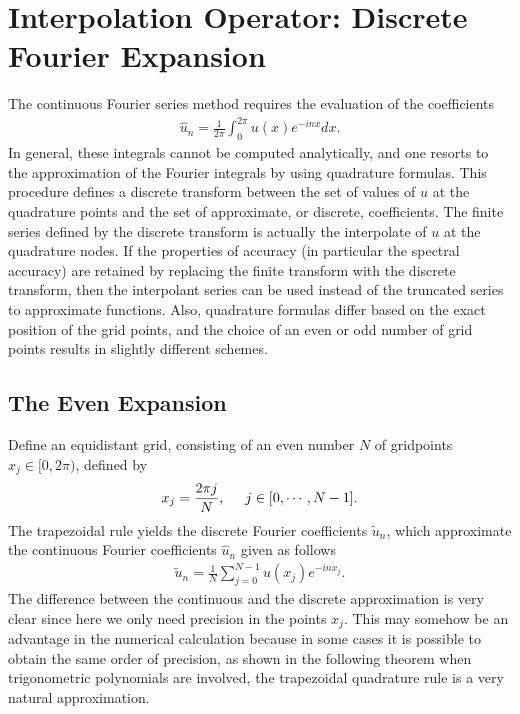\section{Interpolation Operator: Discrete Fourier Expansion}
    
    The continuous Fourier series method requires the evaluation of the coefficients
    \begin{align}
        \hat{u}_n = \displaystyle \frac{1}{2\pi} \int_{0}^{2\pi} u(x) e^{-inx} dx.
    \end{align}
    In general, these integrals cannot be computed analytically, and one resorts to the approximation of the Fourier integrals by using quadrature formulas. This procedure defines a discrete transform between the set of values of $u$ at the quadrature points and the set of approximate, or discrete, coefficients. The finite series defined by the discrete transform is actually the interpolate of $u$ at the quadrature nodes. If the properties of accuracy (in particular the spectral accuracy) are retained by replacing the finite transform with the discrete transform, then the interpolant series can be used instead of the truncated series to approximate functions. Also, quadrature formulas differ based on the exact position of the grid points, and the choice of an even or odd number of grid points results in slightly different schemes.
    
    \subsection{The Even Expansion}
    
    Define an equidistant grid, consisting of an even number $N$ of gridpoints $x_j \in [0, 2\pi)$, defined by
	\begin{align*}
        x_j = \frac{2 \pi j}{N} , \hspace{0.5cm} j\in [0, \cdots , N -1]. 
    \end{align*}
    The trapezoidal rule yields the discrete Fourier coefficients $\widetilde{u}_n$, which approximate the continuous Fourier coefficients $\hat{u}_n$ given as follows    
    \begin{align}
        	\widetilde{u}_n = \frac{1}{N}  \displaystyle \sum_{j = 0}^{N - 1} u(x_j) e^{-in x_j}.
    \end{align}
	The difference between the continuous and the discrete approximation is very clear since here we only need precision in the points $ x_j $. This may somehow be an advantage in the numerical calculation because in some cases it is possible to obtain the same order of precision, as shown in the following theorem when trigonometric polynomials are involved, the trapezoidal quadrature rule is a very natural approximation. \\
	
